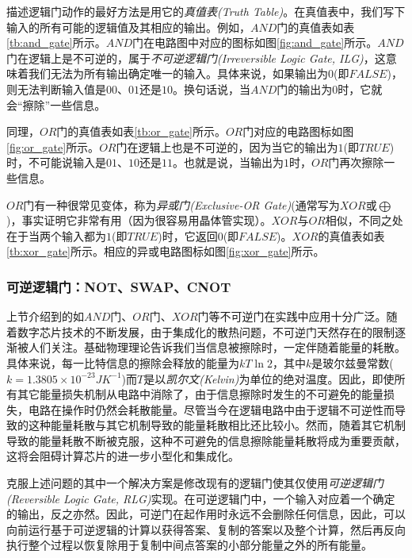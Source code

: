 描述逻辑门动作的最好方法是用它的\emph{真值表(Truth Table)}。在真值表中，我们写下输入的所有可能的逻辑值及其相应的输出。例如，$AND$门的真值表如表\ref{tb:and_gate}所示。$AND$门在电路图中对应的图标如图\ref{fig:and_gate}所示。$AND$门在逻辑上是不可逆的，属于\emph{不可逆逻辑门(Irreversible Logic Gate, ILG)}，这意味着我们无法为所有输出确定唯一的输入。具体来说，如果输出为$0$(即$FALSE$)，则无法判断输入值是$00$、$01$还是$10$。换句话说，当$AND$门的输出为$0$时，它就会“擦除”一些信息。

同理，$OR$门的真值表如表\ref{tb:or_gate}所示。$OR$门对应的电路图标如图\ref{fig:or_gate}所示。$OR$门在逻辑上也是不可逆的，因为当它的输出为$1$(即$TRUE$)时，不可能说输入是$01$、$10$还是$11$。也就是说，当输出为$1$时，$OR$门再次擦除一些信息。

$OR$门有一种很常见变体，称为\emph{异或门(Exclusive-OR Gate)}(通常写为$XOR$或$\bigoplus$)，事实证明它非常有用（因为很容易用晶体管实现）。$XOR$与$OR$相似，不同之处在于当两个输入都为$1$(即$TRUE$)时，它返回$0$(即$FALSE$)。$XOR$的真值表如表\ref{tb:xor_gate}所示。相应的异或电路图标如图\ref{fig:xor_gate}所示。




\subsubsection[可逆逻辑门：NOT、SWAP、CNOT]{可逆逻辑门：NOT、SWAP、CNOT\label{section:reversible_gates}}

上节介绍到的如$AND$门、$OR$门、$XOR$门等不可逆门在实践中应用十分广泛。随着数字芯片技术的不断发展，由于集成化的散热问题，不可逆门天然存在的限制逐渐被人们关注。基础物理理论告诉我们当信息被擦除时，一定伴随着能量的耗散\cite[]{Kastner_Schlatter_2023}。具体来说，每一比特信息的擦除会释放的能量为$kT\ln 2$，其中$k$是玻尔兹曼常数($k=1.3805\times 10^{-23}JK^{-1}$)而$T$是以\emph{凯尔文(Kelvin)}为单位的绝对温度。因此，即使所有其它能量损失机制从电路中消除了，由于信息擦除时发生的不可避免的能量损失，电路在操作时仍然会耗散能量。尽管当今在逻辑电路中由于逻辑不可逆性而导致的这种能量耗散与其它机制导致的能量耗散相比还比较小。然而，随着其它机制导致的能量耗散不断被克服，这种不可避免的信息擦除能量耗散将成为重要贡献，这将会阻碍计算芯片的进一步小型化和集成化。

克服上述问题的其中一个解决方案是修改现有的逻辑门使其仅使用\emph{可逆逻辑门(Reversible Logic Gate, RLG)}实现。在可逆逻辑门中，一个输入对应着一个确定的输出，反之亦然。因此，可逆门在起作用时永远不会删除任何信息，因此，可以向前运行基于可逆逻辑的计算以获得答案、复制的答案以及整个计算，然后再反向执行整个过程以恢复除用于复制中间点答案的小部分能量之外的所有能量。


